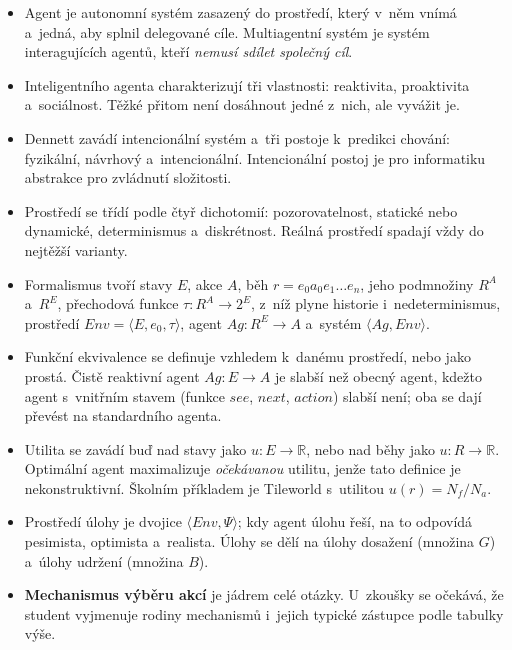 \documentclass[11pt,a4paper]{article}
\theoremstyle{definition}
\begin{document}
\begin{itemize}
\item Agent je autonomní systém zasazený do prostředí, který v~něm vnímá a~jedná, aby splnil
  delegované cíle. Multiagentní systém je systém interagujících agentů, kteří \emph{nemusí
  sdílet společný cíl}.
\item Inteligentního agenta charakterizují tři vlastnosti: reaktivita, proaktivita a~sociálnost.
  Těžké přitom není dosáhnout jedné z~nich, ale vyvážit je.
\item Dennett zavádí intencionální systém a~tři postoje k~predikci chování: fyzikální, návrhový
  a~intencionální. Intencionální postoj je pro informatiku abstrakce pro zvládnutí složitosti.
\item Prostředí se třídí podle čtyř dichotomií: pozorovatelnost, statické nebo dynamické,
  determinismus a~diskrétnost. Reálná prostředí spadají vždy do nejtěžší varianty.
\item Formalismus tvoří stavy $E$, akce $A$, běh $r = e_0 a_0 e_1 \dots e_n$, jeho podmnožiny
  $R^A$ a~$R^E$, přechodová funkce $\tau : R^A \to 2^E$, z~níž plyne historie i~nedeterminismus,
  prostředí $\mathit{Env}=\langle E,e_0,\tau\rangle$, agent $Ag : R^E \to A$ a~systém
  $\langle Ag,\mathit{Env}\rangle$.
\item Funkční ekvivalence se definuje vzhledem k~danému prostředí, nebo jako prostá. Čistě
  reaktivní agent $Ag: E \to A$ je slabší než obecný agent, kdežto agent s~vnitřním stavem
  (funkce $\mathit{see}$, $\mathit{next}$, $\mathit{action}$) slabší není; oba se dají převést
  na standardního agenta.
\item Utilita se zavádí buď nad stavy jako $u : E \to \mathbb{R}$, nebo nad běhy jako
  $u : R \to \mathbb{R}$. Optimální agent maximalizuje \emph{očekávanou} utilitu, jenže tato
  definice je nekonstruktivní. Školním příkladem je Tileworld s~utilitou $u(r)=N_f/N_a$.
\item Prostředí úlohy je dvojice $\langle \mathit{Env}, \Psi\rangle$; kdy agent úlohu řeší, na
  to odpovídá pesimista, optimista a~realista. Úlohy se dělí na úlohy dosažení (množina $G$)
  a~úlohy udržení (množina $B$).
\item \textbf{Mechanismus výběru akcí} je jádrem celé otázky. U~zkoušky se očekává, že student
  vyjmenuje rodiny mechanismů i~jejich typické zástupce podle tabulky výše.
\end{itemize}

\end{document}
